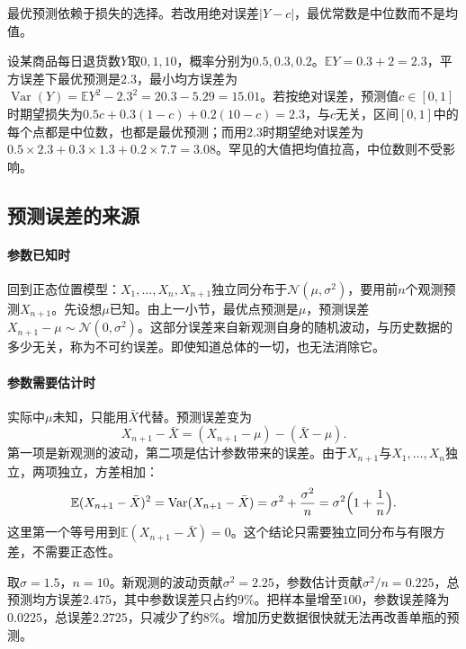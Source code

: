 最优预测依赖于损失的选择。若改用绝对误差$|Y-c|$，最优常数是中位数而不是均值。

\begin{example}[均值与中位数作为预测]
\label{ex:pred-mean-median}
设某商品每日退货数$Y$取$0,1,10$，概率分别为$0.5,0.3,0.2$。$\mathbb EY=0.3+2=2.3$，平方误差下最优预测是$2.3$，最小均方误差为$\operatorname{Var}(Y)=\mathbb EY^2-2.3^2=20.3-5.29=15.01$。若按绝对误差，预测值$c\in[0,1]$时期望损失为$0.5c+0.3(1-c)+0.2(10-c)=2.3$，与$c$无关，区间$[0,1]$中的每个点都是中位数，也都是最优预测；而用$2.3$时期望绝对误差为$0.5\times2.3+0.3\times1.3+0.2\times7.7=3.08$。罕见的大值把均值拉高，中位数则不受影响。
\end{example}

\subsection{预测误差的来源}

\paragraph{参数已知时}

回到正态位置模型：$X_1,\dots,X_n,X_{n+1}$独立同分布于$\mathcal N(\mu,\sigma^2)$，要用前$n$个观测预测$X_{n+1}$。先设想$\mu$已知。由上一小节，最优点预测是$\mu$，预测误差$X_{n+1}-\mu\sim\mathcal N(0,\sigma^2)$。这部分误差来自新观测自身的随机波动，与历史数据的多少无关，称为不可约误差。即使知道总体的一切，也无法消除它。

\paragraph{参数需要估计时}

实际中$\mu$未知，只能用$\bar X$代替。预测误差变为
\[
 X_{n+1}-\bar X=(X_{n+1}-\mu)-(\bar X-\mu).
\]
第一项是新观测的波动，第二项是估计参数带来的误差。由于$X_{n+1}$与$X_1,\dots,X_n$独立，两项独立，方差相加：
\begin{equation}
 \mathbb E(X_{n+1}-\bar X)^2=\operatorname{Var}(X_{n+1}-\bar X)=\sigma^2+\frac{\sigma^2}n=\sigma^2\Bigl(1+\frac1n\Bigr).
 \label{eq:pred-prediction-variance}
\end{equation}
这里第一个等号用到$\mathbb E(X_{n+1}-\bar X)=0$。这个结论只需要独立同分布与有限方差，不需要正态性。

\begin{example}[两种误差的相对大小]
\label{ex:pred-error-sources}
取$\sigma=1.5$，$n=10$。新观测的波动贡献$\sigma^2=2.25$，参数估计贡献$\sigma^2/n=0.225$，总预测均方误差$2.475$，其中参数误差只占约$9\%$。把样本量增至$100$，参数误差降为$0.0225$，总误差$2.2725$，只减少了约$8\%$。增加历史数据很快就无法再改善单瓶的预测。
\end{example}

